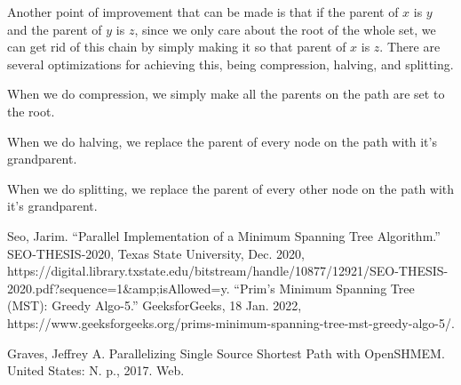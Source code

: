 \documentclass[conference]{IEEEtran}
\begin{document}
Another point of improvement that can be made is that if the parent of $x$ is $y$ and the parent of $y$ is $z$, since we only care about the root of the whole set, we can get rid of this chain by simply making it so that parent of $x$ is $z$. There are several optimizations for achieving this, being compression, halving, and splitting.

When we do compression, we simply make all the parents on the path are set to the root.



When we do halving, we replace the parent of every node on the path with it's grandparent.



When we do splitting, we replace the parent of every other node on the path with it's grandparent.



\begin{thebibliography}{00}
Seo, Jarim. “Parallel Implementation of a Minimum Spanning Tree Algorithm.” SEO-THESIS-2020, Texas State University, Dec. 2020, https://digital.library.txstate.edu/bitstream/handle/10877/12921/SEO-THESIS-2020.pdf?sequence=1\&amp;isAllowed=y. 
“Prim's Minimum Spanning Tree (MST): Greedy Algo-5.” GeeksforGeeks, 18 Jan. 2022, https://www.geeksforgeeks.org/prims-minimum-spanning-tree-mst-greedy-algo-5/. 

Graves, Jeffrey A. Parallelizing Single Source Shortest Path with OpenSHMEM. United States: N. p., 2017. Web.

\end{thebibliography}
\end{document}
